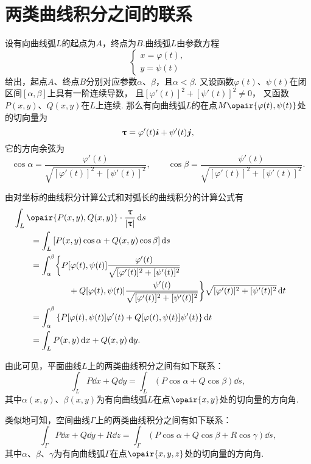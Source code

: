 \section{两类曲线积分之间的联系}
\begingroup
\def\lenTau{\sqrt{[\varphi'(t)]^2+[\psi'(t)]^2}}
\def\fTau#1{\frac{#1}{\lenTau}}
\def\funcParam{[\varphi(t),\psi(t)]}

设有向曲线弧\(L\)的起点为\(A\)，终点为\(B\).曲线弧\(L\)由参数方程\[
\begin{cases}
x = \varphi(t), \\
y = \psi(t)
\end{cases}
\]给出，起点\(A\)、终点\(B\)分别对应参数\(\alpha\)、\(\beta\)，且\(\alpha < \beta\).
又设函数\(\varphi(t)\)、\(\psi(t)\)在闭区间\([\alpha,\beta]\)上具有一阶连续导数，
且\([\varphi'(t)]^2+[\psi'(t)]^2 \neq 0\)，
又函数\(P(x,y)\)、\(Q(x,y)\)在\(L\)上连续.
那么有向曲线弧\(L\)的在点\(M\opair{\varphi(t),\psi(t)}\)处的切向量为\[
\boldsymbol{\uptau} = \varphi'(t) \boldsymbol{i} + \psi'(t) \boldsymbol{j},
\]它的方向余弦为\[
\cos\alpha=\fTau{\varphi'(t)},
\qquad
\cos\beta=\fTau{\psi'(t)}.
\]

由对坐标的曲线积分计算公式和对弧长的曲线积分的计算公式有
\begin{align*}
&\hspace{-20pt}\int_L{\opair{P(x,y),Q(x,y)}\cdot\frac{\mat{\tau}}{\abs{\mat{\tau}}}\dd{s}} \\
&=\int_L{[P(x,y)\cos\alpha+Q(x,y)\cos\beta]\dd{s}} \\
&=\int_{\alpha}^{\beta} \biggl\{ {P\funcParam\fTau{\varphi'(t)}} \\
	&\hspace{45pt}+{Q\funcParam\fTau{\psi'(t)}} \biggr\} \lenTau \dd{t} \\
&=\int_{\alpha}^{\beta} \left\{
		P\funcParam\varphi'(t) + Q\funcParam\psi'(t)
	\right\} \dd{t} \\
&=\int_L{P(x,y)\dd{x}+Q(x,y)\dd{y}}.
\end{align*}
\endgroup

由此可见，平面曲线\(L\)上的两类曲线积分之间有如下联系：
\begin{equation}\label{equation:线积分与面积分.平面曲线上两类曲线积分之间的联系}
\int_L{P\dd{x}+Q\dd{y}}
=\int_L{(P\cos\alpha+Q\cos\beta)\dd{s}},
\end{equation}
其中\(\alpha(x,y)\)、\(\beta(x,y)\)为有向曲线弧\(L\)在点\(\opair{x,y}\)处的切向量的方向角.

类似地可知，空间曲线\(\Gamma\)上的两类曲线积分之间有如下联系：
\begin{equation}\label{equation:线积分与面积分.空间曲线上两类曲线积分之间的联系}
\int_{\Gamma}{P\dd{x}+Q\dd{y}+R\dd{z}}
=\int_{\Gamma}{(P\cos\alpha+Q\cos\beta+R\cos\gamma)\dd{s}},
\end{equation}其中\(\alpha\)、\(\beta\)、\(\gamma\)为有向曲线弧\(\Gamma\)在点\(\opair{x,y,z}\)处的切向量的方向角.

